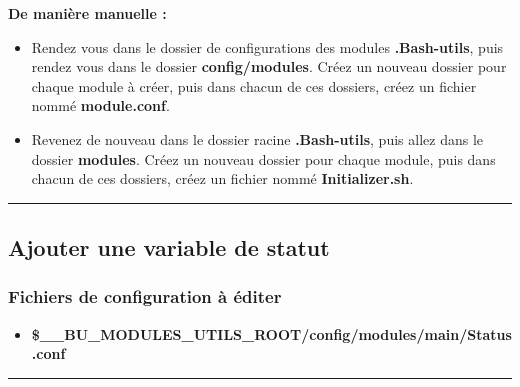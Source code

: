 \documentclass[a4paper,10pt]{article}
\begin{document}
    \begin{justify}
        \textbf{De manière manuelle :}
        \begin{itemize}
            \item  Rendez vous dans le dossier de configurations des modules \textbf{\color{path}.Bash-utils}, puis rendez vous dans le dossier \textbf{\color{path}config/modules}. Créez un nouveau dossier pour chaque module à créer, puis dans chacun de ces dossiers, créez un fichier nommé \textbf{\color{path}module.conf}.\\\mbox{}

            \item Revenez de nouveau dans le dossier racine \textbf{\color{path}.Bash-utils}, puis allez dans le dossier \textbf{\color{path}modules}. Créez un nouveau dossier pour chaque module, puis dans chacun de ces dossiers, créez un fichier nommé \textbf{\color{path}Initializer.sh}.
        \end{itemize}
    \end{justify}




    \color{sec2}\par\noindent\rule{\textwidth}{0.4pt}\color{text}

    \color{sec2}
    \subsection{Ajouter une variable de statut}\color{text}

    \color{sec3}
    \subsubsection{Fichiers de configuration à éditer}\color{text}

    \begin{itemize}
        \item \textbf{\color{vars}\$\_\_BU\_MODULES\_UTILS\_ROOT\color{path}/config/modules/main/Status.conf}\\[1\baselineskip]
    \end{itemize}



    \color{sec3}\par\noindent\rule{\textwidth}{0.4pt}\color{text}
\end{document}
